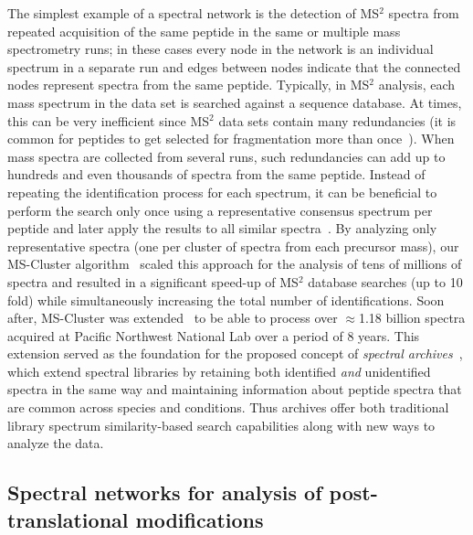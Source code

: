 \documentclass[8.5pt,twoside,twocolumn]{article}
\begin{document}
The simplest example of a spectral network is the detection of MS$^2$ spectra from repeated acquisition of the same peptide in the same or multiple mass spectrometry runs; in these cases every node in the network is an individual spectrum in a separate run and edges between nodes indicate that the connected nodes represent spectra from the same peptide. Typically, in MS$^2$ analysis, each mass spectrum in the data set is searched against a sequence database. At times, this can be very inefficient since MS$^2$ data sets contain many redundancies (it is common for peptides to get selected for fragmentation more than once~\cite{tabb03a}). When mass spectra are collected from several runs, such redundancies can add up to hundreds and even thousands of spectra from the same
peptide. Instead of repeating the identification process for each spectrum, it can be beneficial to perform the search only once using a representative consensus spectrum per peptide and later apply the results to all similar spectra~\cite{tabb03a,beer04,tabb05}. By analyzing only representative spectra (one per cluster of spectra from each precursor mass), our MS-Cluster algorithm~\cite{frank08} scaled this approach for the analysis of tens of millions of spectra and resulted in a significant speed-up of MS$^2$ database searches (up to 10 fold) while simultaneously increasing the total number of identifications. Soon after, MS-Cluster was extended~\cite{frank11} to be able to process over $\approx$1.18 billion spectra acquired at Pacific Northwest National Lab over a period of 8 years. This extension served as the foundation for the proposed concept of {\em spectral archives}~\cite{frank11}, which extend spectral libraries by retaining both identified {\em and} unidentified spectra in the same way and maintaining information about peptide spectra that are common across species and conditions. Thus archives offer both traditional library spectrum similarity-based search capabilities along with new ways to analyze the data.

\subsection*{Spectral networks for analysis of post-translational modifications}
\end{document}
